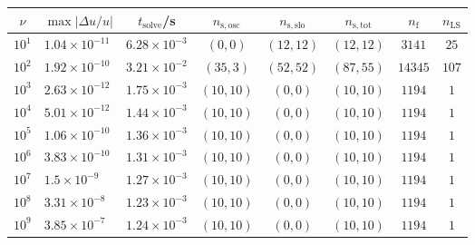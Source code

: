 \begin{tabular}{c l c c c c c c}
\hline \hline 
 $\nu$  &  $\max|\Delta u/u|$  &  $t_{\mathrm{solve}}$/\si{\s} &  $n_{\mathrm{s,osc}}$  &  $n_{\mathrm{s,slo}}$  &  $n_{\mathrm{s,tot}}$  &  $n_{\mathrm{f}}$  &  $n_{\mathrm{LS}}$  \\ \hline
$10^1$  &  $1.04 \times 10^{-11}$  &  $6.28 \times 10^{-3}$  &  $(0, 0)$  &  $(12, 12)$  &  $(12, 12)$  &  $3141$  &  $25$\\ 
$10^2$  &  $1.92 \times 10^{-10}$  &  $3.21 \times 10^{-2}$  &  $(35, 3)$  &  $(52, 52)$  &  $(87, 55)$  &  $14345$  &  $107$\\ 
$10^3$  &  $2.63 \times 10^{-12}$  &  $1.75 \times 10^{-3}$  &  $(10, 10)$  &  $(0, 0)$  &  $(10, 10)$  &  $1194$  &  $1$\\ 
$10^4$  &  $5.01 \times 10^{-12}$  &  $1.44 \times 10^{-3}$  &  $(10, 10)$  &  $(0, 0)$  &  $(10, 10)$  &  $1194$  &  $1$\\ 
$10^5$  &  $1.06 \times 10^{-10}$  &  $1.36 \times 10^{-3}$  &  $(10, 10)$  &  $(0, 0)$  &  $(10, 10)$  &  $1194$  &  $1$\\ 
$10^6$  &  $3.83 \times 10^{-10}$  &  $1.31 \times 10^{-3}$  &  $(10, 10)$  &  $(0, 0)$  &  $(10, 10)$  &  $1194$  &  $1$\\ 
$10^7$  &  $1.5 \times 10^{-9}$  &  $1.27 \times 10^{-3}$  &  $(10, 10)$  &  $(0, 0)$  &  $(10, 10)$  &  $1194$  &  $1$\\ 
$10^8$  &  $3.31 \times 10^{-8}$  &  $1.23 \times 10^{-3}$  &  $(10, 10)$  &  $(0, 0)$  &  $(10, 10)$  &  $1194$  &  $1$\\ 
$10^9$  &  $3.85 \times 10^{-7}$  &  $1.24 \times 10^{-3}$  &  $(10, 10)$  &  $(0, 0)$  &  $(10, 10)$  &  $1194$  &  $1$\\ 
\hline \hline 
\end{tabular}

